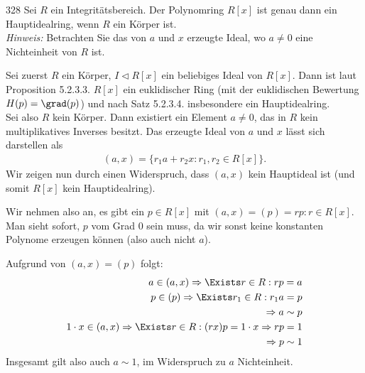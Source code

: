 \begin{algebraUE}{328}
Sei $R$ ein Integritätsbereich. Der Polynomring $R[x]$ ist genau dann ein
Hauptidealring, wenn $R$ ein Körper ist. \\
\textit{Hinweis:} Betrachten Sie das von $a$ und $x$ erzeugte Ideal, wo $a \neq 0$
eine Nichteinheit von $R$ ist.
\end{algebraUE}
\begin{solution}
Sei zuerst $R$ ein Körper, $I \vartriangleleft R[x]$ ein beliebiges Ideal von $R[x]$.
Dann ist laut Proposition 5.2.3.3. $R[x]$ ein euklidischer Ring (mit der euklidischen
Bewertung $H(p) = \grad(p)$) und nach Satz 5.2.3.4.
insbesondere ein Hauptidealring. \\
Sei also $R$ kein Körper. Dann existiert ein Element $a \neq 0$, das in $R$ kein
multiplikatives Inverses besitzt. Das erzeugte Ideal von $a$ und $x$ lässt sich darstellen als
\begin{align*}
  (a,x) = \{r_1a + r_2x: r_1,r_2 \in R[x]\}.
\end{align*}
Wir zeigen nun durch einen Widerspruch, dass $(a,x)$ kein Hauptideal ist (und somit $R[x]$ kein Hauptidealring).

Wir nehmen also an, es gibt ein $p \in R[x]$ mit $(a,x) = (p) = {rp: r \in R[x]}$. Man sieht sofort, $p$ vom Grad $0$ sein muss, da wir sonst keine konstanten Polynome erzeugen können (also auch nicht $a$).

Aufgrund von $(a,x)=(p)$ folgt:
\begin{align*}
  a \in (a,x) \Rightarrow \Exists r \in R: rp = a \\
  p \in (p) \Rightarrow \Exists r_1 \in R: r_1 a = p \\
  \Rightarrow a \sim p \\
  1\cdot x \in (a,x) \Rightarrow \Exists r \in R: (rx)p = 1\cdot x \Rightarrow rp = 1 \\
  \Rightarrow p \sim 1
\end{align*}
Insgesamt gilt also auch $a \sim 1$, im Widerspruch zu $a$ Nichteinheit.
\end{solution}
